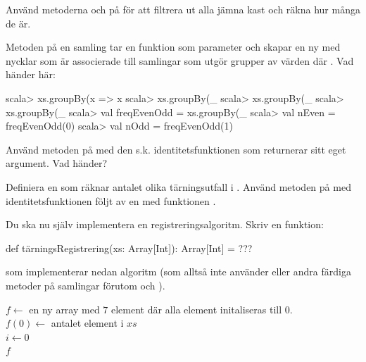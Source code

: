 \Subtask Använd metoderna  och  på  för att filtrera ut alla jämna kast och räkna hur många de är.

\Subtask Metoden  på en samling tar en funktion  som parameter och skapar en ny  med nycklar  som är associerade till samlingar som utgör grupper av värden där
.  Vad händer här:
\begin{REPL}
scala> xs.groupBy(x => x %
scala> xs.groupBy(_ %
scala> xs.groupBy(_ %
scala> xs.groupBy(_ %
scala> val freqEvenOdd = xs.groupBy(_ %
scala> val nEven = freqEvenOdd(0)
scala> val nOdd = freqEvenOdd(1)
\end{REPL}
\Subtask Använd metoden  på  med den s.k. identitetsfunktionen  som returnerar sitt eget argument. Vad händer?

\Subtask Definiera en  som räknar antalet olika tärningsutfall i . Använd metoden  på  med identitetsfunktionen följt av en  med funktionen .

\Subtask Du ska nu själv implementera en registreringsalgoritm. Skriv en funktion:
\begin{Code}
def tärningsRegistrering(xs: Array[Int]): Array[Int] = ???
\end{Code}
som implementerar nedan algoritm (som alltså inte använder  eller andra färdiga metoder på samlingar förutom  och ).

\begin{algorithm}[H]

 $f \leftarrow$ en ny array med $7$ element där alla element initaliseras till 0.\\
 $f(0) \leftarrow$ antalet element i $xs$ \\
 $i \leftarrow 0$  \\
 \Return $f$
\end{algorithm}

